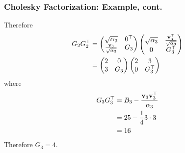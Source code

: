 \documentclass{beamer}
\begin{document}
\begin{frame}\frametitle{Cholesky Factorization: Example, cont.}
	Therefore
	\begin{align*}
		G_2 G_2^\top &= \begin{pmatrix}
 				\sqrt{\alpha_3} & 0^\top \\ \frac{\mathbf{v}_3}{\sqrt{\alpha_3}} & G_3
 			 \end{pmatrix}
 			 \begin{pmatrix}
 				\sqrt{\alpha_3} & \frac{\mathbf{v}_3^\top}{\sqrt{\alpha_3}} \\ 0 & G_3^\top
 			 \end{pmatrix} \\
 		&= \begin{pmatrix}
				2 & 0   \\
				3 & G_3 
			\end{pmatrix}
			\begin{pmatrix}
				2 & 3  \\
				0 & G_3^\top 
			\end{pmatrix}
	\end{align*}
	where
	\begin{align*}
		G_3 G_3^\top &= B_3 - \frac{\mathbf{v}_3 \mathbf{v}_3^\top}{\alpha_3} \\
		&= 25 - \frac{1}{4} 3 \cdot 3 \\
 		&= 	16
	\end{align*}
	Therefore $G_3=4$.
\end{frame}
\end{document}
